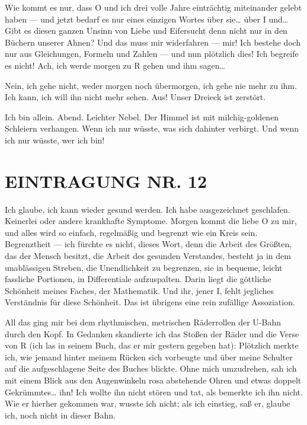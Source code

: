 Wie kommt es nur, dass O und ich drei volle Jahre einträchtig
miteinander gelebt haben — und jetzt bedarf es nur eines einzigen
Wortes über sie\ldots{} über I und\ldots{} Gibt es diesen ganzen Unsinn von
Liebe und Eifersucht
denn nicht nur in den Büchern unserer Ahnen? Und das muss mir
widerfahren — mir! Ich bestehe doch nur aus Gleichungen, Formeln
und Zahlen — und nun plötzlich dies! Ich begreife es nicht! Ach,
ich werde morgen zu R gehen und ihm sagen\ldots{}

Nein, ich gehe nicht, weder morgen noch übermorgen, ich gehe nie
mehr zu ihm. Ich kann, ich will ihn nicht mehr sehen. Aus! Unser
Dreieck ist zerstört.

Ich bin allein. Abend. Leichter Nebel. Der
Himmel ist mit milchig-goldenen Schleiern verhangen. Wenn ich nur
wüsste, was sich dahinter verbirgt. Und wenn ich nur wüsste, wer
ich bin!

\section{EINTRAGUNG NR. 12}

Ich glaube, ich kann wieder gesund werden. Ich habe ausgezeichnet
geschlafen. Keinerlei  oder andere krankhafte Symptome.
Morgen kommt die liebe O zu mir, und alles wird so einfach,
regelmäßig und begrenzt wie ein Kreis sein. Begrenztheit — ich
fürchte es nicht, dieses Wort, denn die Arbeit des Größten, das der
Mensch besitzt, die Arbeit des gesunden Verstandes, besteht ja in
dem unablässigen Streben, die Unendlichkeit zu begrenzen, sie in
bequeme, leicht fassliche Portionen, in Differentiale aufzuspalten.
Darin liegt die göttliche Schönheit meines Faches, der Mathematik.
Und ihr, jener I, fehlt jegliches Verständnis für diese Schönheit.
Das ist übrigens eine rein zufällige Assoziation.

All das ging mir
bei dem rhythmischen, metrischen Räderrollen
der U-Bahn durch den Kopf. In Gedanken skandierte ich das
Stoßen der Räder und die Verse von R (ich las in seinem Buch, das
er mir gestern gegeben hat): Plötzlich merkte ich, wie jemand
hinter meinem Rücken sich vorbeugte und über meine Schulter auf die
aufgeschlagene Seite des Buches blickte. Ohne mich umzudrehen, sah
ich mit einem Blick aus den Augenwinkeln rosa abstehende Ohren und
etwas doppelt Gekrümmtes\ldots{} ihn! Ich wollte ihn nicht stören und
tat, als bemerkte ich ihn nicht. Wie er hierher gekommen war,
wusste ich nicht; als ich einstieg, saß er, glaube ich, noch nicht
in dieser Bahn.

